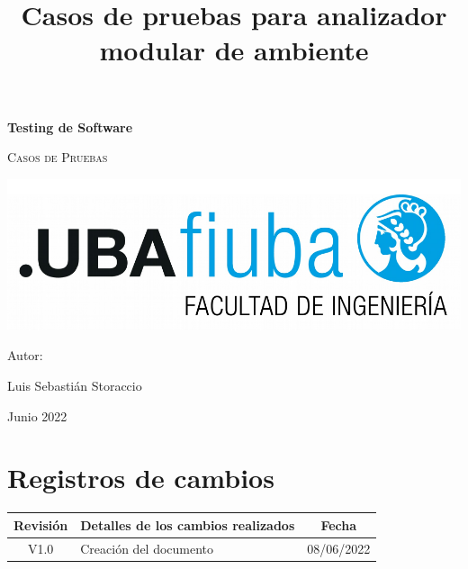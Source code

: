 \documentclass[11pt]{article}
\date{}
\title{Casos de pruebas para analizador modular de ambiente}
\begin{document}
\begin{titlepage}
    \centering
    {\bfseries\LARGE Testing de Software \par}

    \vspace{3cm}
    {\scshape\Huge Casos de Pruebas \par}
    \vspace{3cm}
    \includegraphics[scale=0.8]{Figuras/logoFIUBA.pdf}
    \vfill
    {\Large Autor: \par}
    {\Large Luis Sebastián Storaccio \par}
    \vfill
    {\Large Junio 2022 \par}
\end{titlepage}

\thispagestyle{empty}
{\setlength{\parskip}{0pt}
    \tableofcontents{}
}
\pagebreak

\section*{Registros de cambios}
\label{sec:registro}
\vspace{5cm}
\begin{table}[!ht]
    \label{tab:registro}
    \centering

    \begin{tabularx}{\linewidth}{@{}|c|X|c|@{}}
        \hline
        \rowcolor[HTML]{d6c6c3}
        \bf Revisión & \multicolumn{1}{c|}{\bf Detalles de los cambios
        realizados}  &
        \bf Fecha
        \\ \hline
        V1.0         & Creación del documento
                     & 08/06/2022
        \\
        \hline
    \end{tabularx}
\end{table}

\pagebreak
\end{document}
